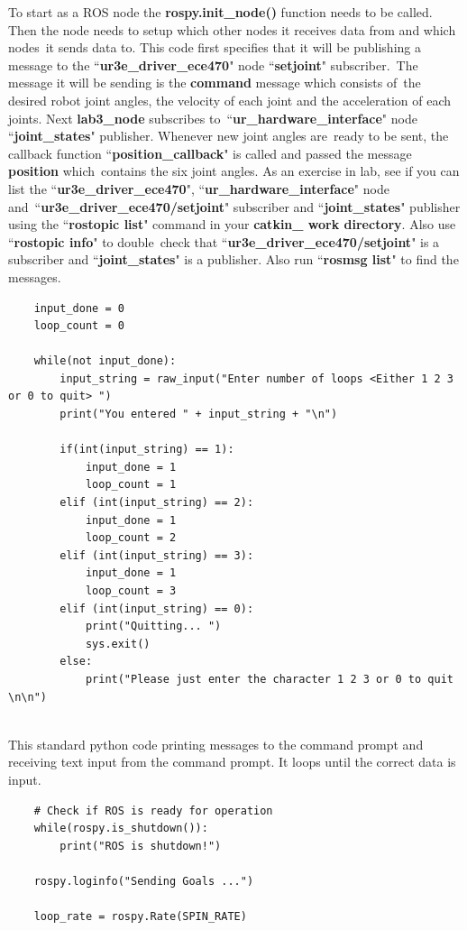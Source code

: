To start as a ROS node the \textbf{rospy.init\_node()} function needs to be called.  Then the node needs to setup which other nodes it receives data from and which nodes\
it sends data to.  This code first specifies that it will be publishing a message to the ``\textbf{ur3e\_driver\_ece470}" node ``\textbf{setjoint}" subscriber.\
The message it will be sending is the \textbf{command} message which consists of\
the desired robot joint angles, the velocity of each joint and the acceleration of each joints.  Next \textbf{lab3\_node} subscribes to\
``\textbf{ur\_hardware\_interface}" node ``\textbf{joint\_states}" publisher.  Whenever new joint angles are\
ready to be sent, the callback function ``\textbf{position\_callback}" is called and passed the message \textbf{position} which\
contains the six joint angles.
As an exercise in lab, see if you can list the ``\textbf{ur3e\_driver\_ece470}", ``\textbf{ur\_hardware\_interface}" node and\
``\textbf{ur3e\_driver\_ece470/setjoint}" subscriber and ``\textbf{joint\_states}" publisher using the ``\textbf{rostopic list}" command in your \textbf{catkin\_ work directory}.  Also use ``\textbf{rostopic info}" to double\
check that ``\textbf{ur3e\_driver\_ece470/setjoint}" is a subscriber and ``\textbf{joint\_states}" is a publisher.  Also run ``\textbf{rosmsg list}" to find the messages.  

{\footnotesize
\begin{verbatim}   
    input_done = 0
    loop_count = 0
    
    while(not input_done):
        input_string = raw_input("Enter number of loops <Either 1 2 3 or 0 to quit> ")
        print("You entered " + input_string + "\n")
    
        if(int(input_string) == 1):
            input_done = 1
            loop_count = 1
        elif (int(input_string) == 2):
            input_done = 1
            loop_count = 2
        elif (int(input_string) == 3):
            input_done = 1
            loop_count = 3
        elif (int(input_string) == 0):
            print("Quitting... ")
            sys.exit()
        else:
            print("Please just enter the character 1 2 3 or 0 to quit \n\n")
	
\end{verbatim}}

This standard python code printing messages to the command prompt and receiving text input from the command prompt.  It loops until the correct data is input. 

{\footnotesize
\begin{verbatim}
    # Check if ROS is ready for operation
    while(rospy.is_shutdown()):
        print("ROS is shutdown!")

    rospy.loginfo("Sending Goals ...")
	
    loop_rate = rospy.Rate(SPIN_RATE)
\end{verbatim}}

